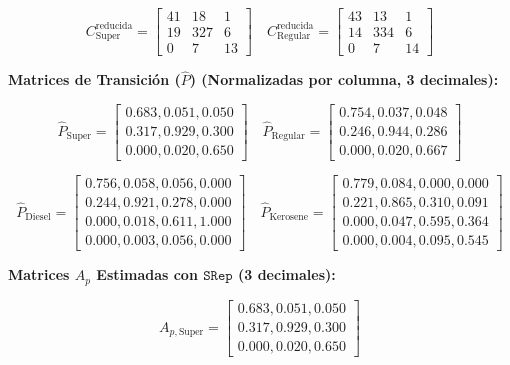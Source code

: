 \begin{examplex}
\[
C_{\text{Super}}^{\text{reducida}} = \begin{bmatrix}
41 & 18 & 1 \\
19 & 327 & 6 \\
0 & 7 & 13
\end{bmatrix}
\quad
C_{\text{Regular}}^{\text{reducida}} = \begin{bmatrix}
43 & 13 & 1 \\
14 & 334 & 6 \\
0 & 7 & 14
\end{bmatrix}
\]

\bigskip
\noindent\textbf{Matrices de Transición ($\hat{P}$) (Normalizadas por columna, 3 decimales):}

\[
\hat{P}_{\text{Super}} = \begin{bmatrix}
0.683, 0.051, 0.050\\
0.317, 0.929, 0.300 \\
0.000, 0.020, 0.650
\end{bmatrix}
\quad
\hat{P}_{\text{Regular}} = \begin{bmatrix}
0.754, 0.037, 0.048 \\
0.246, 0.944, 0.286 \\
0.000, 0.020, 0.667
\end{bmatrix}
\]

\[
\hat{P}_{\text{Diesel}} = \begin{bmatrix}
0.756, 0.058, 0.056, 0.000 \\
0.244, 0.921, 0.278, 0.000 \\
0.000, 0.018, 0.611, 1.000 \\
0.000, 0.003, 0.056, 0.000
\end{bmatrix}
\quad
\hat{P}_{\text{Kerosene}} = \begin{bmatrix}
0.779, 0.084, 0.000, 0.000 \\
0.221, 0.865, 0.310, 0.091 \\
0.000, 0.047, 0.595, 0.364 \\
0.000, 0.004, 0.095, 0.545
\end{bmatrix}
\]

\bigskip
\noindent\textbf{Matrices \(A_p\) Estimadas con \( \texttt{SRep} \) (3 decimales):}

\[
A_{p, \text{Super}} = \begin{bmatrix}
0.683, 0.051, 0.050 \\
0.317, 0.929, 0.300 \\
0.000, 0.020, 0.650
\end{bmatrix}
\]


\end{examplex}
